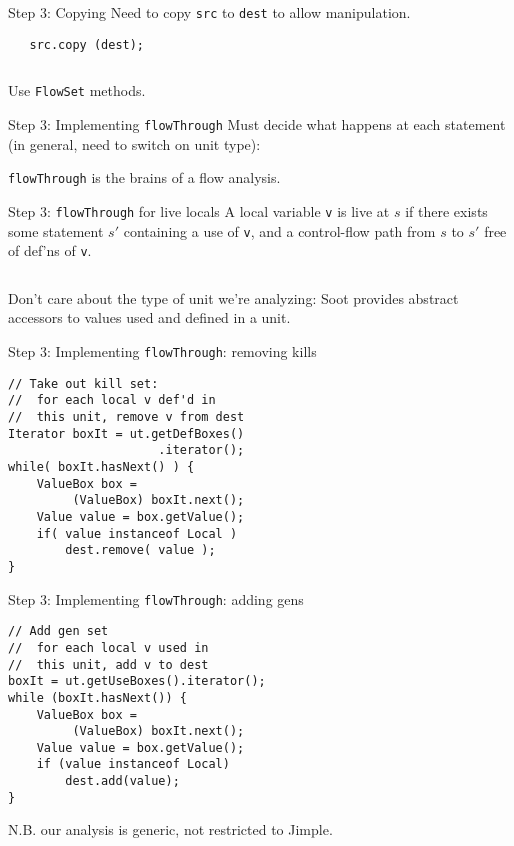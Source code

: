 \begin{slide}{Step 3: Copying}
Need to copy {\tt src} to {\tt dest} to allow manipulation.

\begin{center}

\end{center}

\begin{verbatim}
   src.copy (dest);
\end{verbatim}

$\quad$

Use {\tt FlowSet} methods.
\end{slide}

\begin{slide}{Step 3: Implementing {\tt flowThrough}}
Must decide what happens at each statement (in general, need to switch
on unit type):
\begin{center}
\scalebox{1.3}{
}
\end{center}
{\tt flowThrough} is the brains of a flow analysis.
\end{slide}

\begin{slide}{Step 3: {\tt flowThrough} for live locals}
\vspace*{0.1in}
A local variable {\tt v} is {\red live} at $s$ if there exists some
statement $s'$ containing a use of {\tt v},
and a control-flow path from $s$ to $s'$ free
of def'ns of {\tt v}.

$\quad$

Don't care about the type of unit we're analyzing: Soot provides
abstract accessors to values used and defined in a unit.

\end{slide}

\begin{slide}{Step 3: Implementing {\tt flowThrough}: removing kills}
\begin{verbatim}
// Take out kill set:
//  for each local v def'd in 
//  this unit, remove v from dest
Iterator boxIt = ut.getDefBoxes()
                     .iterator();
while( boxIt.hasNext() ) {
    ValueBox box = 
         (ValueBox) boxIt.next();
    Value value = box.getValue();
    if( value instanceof Local )
        dest.remove( value );
}
\end{verbatim}
\end{slide}

\begin{slide}{Step 3: Implementing {\tt flowThrough}: adding gens}
\vspace*{-0.2in}
\begin{verbatim}
// Add gen set
//  for each local v used in 
//  this unit, add v to dest
boxIt = ut.getUseBoxes().iterator();
while (boxIt.hasNext()) {
    ValueBox box = 
         (ValueBox) boxIt.next();
    Value value = box.getValue();
    if (value instanceof Local)
        dest.add(value);
}
\end{verbatim}

\vspace*{0.05in}

N.B. our analysis is generic, not restricted to Jimple.
\end{slide}

